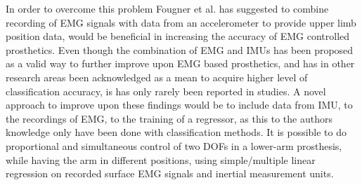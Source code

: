 In order to overcome this problem Fougner et al. \cite{Fougner2011} has suggested to combine recording of EMG signals with data from an accelerometer to provide upper limb position data, would be beneficial in increasing the accuracy of EMG controlled prosthetics. Even though the combination of EMG and IMUs has been proposed as a valid way to further improve upon EMG based prosthetics, and has in other research areas been acknowledged as a mean to acquire higher level of classification accuracy, is has only rarely been reported in studies. \cite{Roy2010, Imtiaz2014, jiang2012}
A novel approach to improve upon these findings would be to include data from IMU, to the recordings of EMG, to the training of a regressor, as this to the authors knowledge only have been done with classification methods. 
It is possible to do proportional and simultaneous control of two DOFs in a lower-arm prosthesis, while having the arm in different positions, using simple/multiple linear regression on recorded surface EMG signals and inertial measurement units. %


